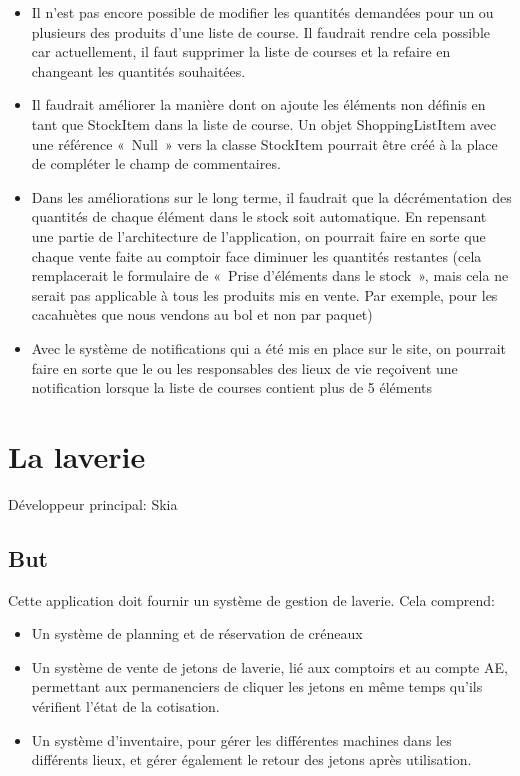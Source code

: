 \documentclass[a4paper]{report}
\begin{document}
\begin{itemize}
    \item Il n’est pas encore possible de modifier les quantités demandées pour un ou plusieurs des produits d’une liste de course. Il faudrait rendre cela possible car actuellement, il faut supprimer la liste de courses et la refaire en changeant les quantités souhaitées.
    \item Il faudrait améliorer la manière dont on ajoute les éléments non définis en tant que StockItem dans la liste de course. Un objet ShoppingListItem avec une référence « Null » vers la classe StockItem pourrait être créé à la place de compléter le champ de commentaires.
    \item Dans les améliorations sur le long terme, il faudrait que la décrémentation des quantités de chaque élément dans le stock soit automatique. En repensant une partie de l’architecture de l’application, on pourrait faire en sorte que chaque vente faite au comptoir face diminuer les quantités restantes (cela remplacerait le formulaire de « Prise d’éléments dans le stock », mais cela ne serait pas applicable à tous les produits mis en vente. Par exemple, pour les cacahuètes que nous vendons au bol et non par paquet)
    \item Avec le système de notifications qui a été mis en place sur le site, on pourrait faire en sorte que le ou les responsables des lieux de vie reçoivent une notification lorsque la liste de courses contient plus de 5 éléments
\end{itemize}


\chapter{La laverie}
\label{sec:la_laverie}
\par Développeur principal: Skia

\section{But}
\label{sub:but}
\par Cette application doit fournir un système de gestion de laverie. Cela comprend:
\begin{itemize}
    \item Un système de planning et de réservation de créneaux
    \item Un système de vente de jetons de laverie, lié aux comptoirs et au compte AE, permettant aux permanenciers de
        cliquer les jetons en même temps qu'ils vérifient l'état de la cotisation.
    \item Un système d'inventaire, pour gérer les différentes machines dans les différents lieux, et gérer également le
        retour des jetons après utilisation.
\end{itemize}
\end{document}
